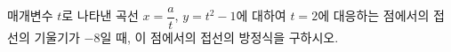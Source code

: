 매개변수 $t$로 나타낸 곡선 $x=\dfrac{a}{t}$, $y=t^2-1$에 대하여 $t=2$에 대응하는 점에서의 접선의 기울기가 $-8$일 때, 이 점에서의 접선의 방정식을 구하시오. 
